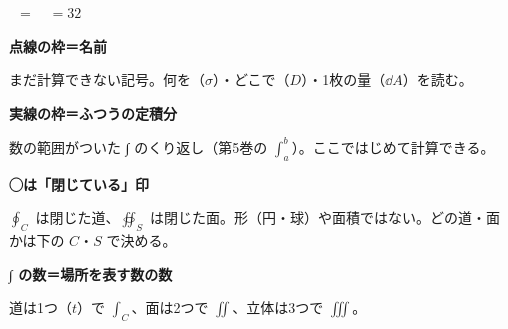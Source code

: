 \noindent\begin{minipage}{\linewidth}
\begin{center}
\ $=$\ \ $=32$
\end{center}
\vspace{-1.5mm}
\noindent\begin{minipage}[t]{0.485\linewidth}\raggedright\kviiizbody\vspace{0pt}
{\sffamily\bfseries 点線の枠＝名前}\par
まだ計算できない記号。何を（$\sigma$）・どこで（$D$）・1枚の量（$\dd A$）を読む。\par\vspace{0.6mm}
{\sffamily\bfseries 実線の枠＝ふつうの定積分}\par
数の範囲がついた ∫ のくり返し（第5巻の $\int_a^b$）。ここではじめて計算できる。
\end{minipage}\hfill
\begin{minipage}[t]{0.485\linewidth}\raggedright\kviiizbody\vspace{0pt}
{\sffamily\bfseries ◯は「閉じている」印}\par
$\oint_C$ は閉じた道、$\oiint_S$ は閉じた面。形（円・球）や面積ではない。どの道・面かは下の $C$・$S$ で決める。\par\vspace{0.6mm}
{\sffamily\bfseries ∫ の数＝場所を表す数の数}\par
道は1つ（$t$）で $\int_C$、面は2つで $\iint$、立体は3つで $\iiint$。
\end{minipage}
\end{minipage}
\vspace{1mm}

